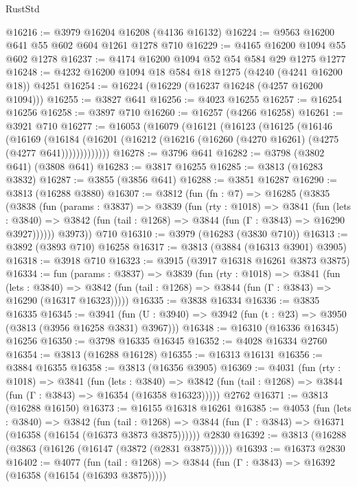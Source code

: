 \begin{lexlean}{RustStd}
\begin{coremodule}
@16216 := @3979 @16204 @16208 (@4136 @16132)
@16224 := @9563 @16200 @641 @55 @602 @604 @1261 @1278 @710
@16229 := @4165 @16200 @1094 @55 @602 @1278
@16237 := @4174 @16200 @1094 @52 @54 @584 @29 @1275 @1277
@16248 := @4232 @16200 @1094 @18 @584 @18 @1275 (@4240 (@4241 @16200 @18)) @4251
@16254 := @16224 (@16229 (@16237 @16248 (@4257 @16200 @1094)))
@16255 := @3827 @641
@16256 := @4023 @16255
@16257 := @16254 @16256
@16258 := @3897 @710
@16260 := @16257 (@4266 @16258)
@16261 := @3921 @710
@16277 := @16053
    (@16079
      (@16121
        (@16123
          (@16125
            (@16146
              (@16169
                (@16184
                  (@16201 (@16212 (@16216 (@16260 (@4270 @16261) (@4275 (@4277 @641)))))))))))))
@16278 := @3796 @641
@16282 := @3798 (@3802 @641) (@3808 @641)
@16283 := @3817 @16255
@16285 := @3813 (@16283 @3832)
@16287 := @3855 (@3856 @641)
@16288 := @3851 @16287
@16290 := @3813 (@16288 @3880)
@16307 := @3812
    (fun (fn : @7) =>
    @16285
      (@3835
        (@3838
          (fun (params : @3837) =>
          @3839
            (fun (rty : @1018) =>
            @3841
              (fun (lets : @3840) =>
              @3842 (fun (tail : @1268) => @3844 (fun (Γ : @3843) => @16290 @3927))))))
        @3973))
    @710
@16310 := @3979 (@16283 (@3830 @710))
@16313 := @3892 (@3893 @710) @16258
@16317 := @3813 (@3884 (@16313 @3901) @3905)
@16318 := @3918 @710
@16323 := @3915 (@3917 @16318 @16261 @3873 @3875)
@16334 := fun (params : @3837) =>
  @3839
    (fun (rty : @1018) =>
    @3841
      (fun (lets : @3840) =>
      @3842 (fun (tail : @1268) => @3844 (fun (Γ : @3843) => @16290 (@16317 @16323)))))
@16335 := @3838 @16334
@16336 := @3835 @16335
@16345 := @3941
    (fun (U : @3940) => @3942 (fun (t : @23) => @3950 (@3813 (@3956 @16258 @3831) @3967)))
@16348 := @16310 (@16336 @16345) @16256
@16350 := @3798 @16335 @16345
@16352 := @4028 @16334 @2760
@16354 := @3813 (@16288 @16128)
@16355 := @16313 @16131
@16356 := @3884 @16355
@16358 := @3813 (@16356 @3905)
@16369 := @4031
    (fun (rty : @1018) =>
    @3841
      (fun (lets : @3840) =>
      @3842 (fun (tail : @1268) => @3844 (fun (Γ : @3843) => @16354 (@16358 @16323)))))
    @2762
@16371 := @3813 (@16288 @16150)
@16373 := @16155 @16318 @16261
@16385 := @4053
    (fun (lets : @3840) =>
    @3842
      (fun (tail : @1268) =>
      @3844 (fun (Γ : @3843) => @16371 (@16358 (@16154 (@16373 @3873 @3875))))))
    @2830
@16392 := @3813 (@16288 (@3863 (@16126 (@16147 (@3872 (@2831 @3875))))))
@16393 := @16373 @2830
@16402 := @4077
    (fun (tail : @1268) => @3844 (fun (Γ : @3843) => @16392 (@16358 (@16154 (@16393 @3875)))))

\end{coremodule}
\end{lexlean}
